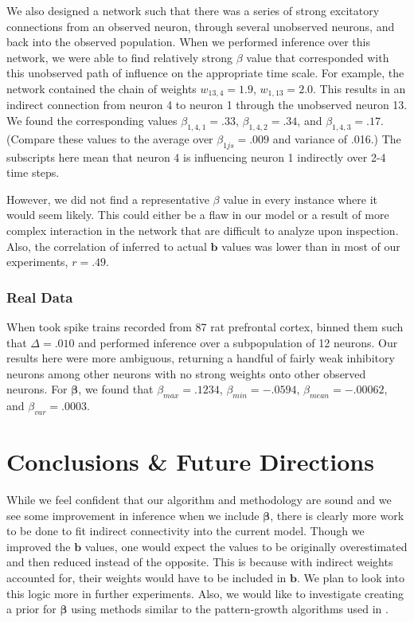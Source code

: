 \documentclass{article}
\begin{document}
We also designed a network such that there was a series of strong excitatory connections from an observed neuron, through several unobserved neurons, and back into the observed population.  When we performed inference over this network, we were able to find relatively strong $\beta$ value that corresponded with this unobserved path of influence on the appropriate time scale. For example, the network contained the chain of weights $w_{13,4}=1.9$, $w_{1,13}=2.0$. This results in an indirect connection from neuron 4 to neuron 1 through the unobserved neuron 13. We found the corresponding values $\beta_{1,4,1}=.33$, $\beta_{1,4,2}=.34$, and $\beta_{1,4,3}=.17$. (Compare these values to the average over $\beta_{1js}=.009$ and variance of .016.) The subscripts here mean that neuron 4 is influencing neuron 1 indirectly over 2-4 time steps.

However, we did not find a representative $\beta$ value in every instance where it would seem likely. This could either be a flaw in our model or a result of more complex interaction in the network that are difficult to analyze upon inspection. Also, the correlation of inferred to actual $\mathbf{b}$ values was lower than in most of our experiments, $r=.49$.

\subsubsection{Real Data}

When took spike trains recorded from 87 rat prefrontal cortex, binned them such that $\Delta = .010$ and performed inference over a subpopulation of 12 neurons. Our results here were more ambiguous, returning a handful of fairly weak inhibitory neurons among other neurons with no strong weights onto other observed neurons. For  $\bm{\beta}$, we found that $\beta_{max}=.1234$, $\beta_{min}=-.0594$, $\beta_{mean}=-.00062$, and $\beta_{var}=.0003$.

\section{Conclusions \& Future Directions}

While we feel confident that our algorithm and methodology are sound and we see some improvement in inference when we include $\bm{\beta}$, there is clearly more work to be done to fit indirect connectivity into the current model. Though we improved the $\mathbf{b}$ values, one would expect the values to be originally overestimated and then reduced instead of the opposite. This is because with indirect weights accounted for, their weights would have to be included in $\mathbf{b}$. We plan to look into this logic more in further experiments. Also, we would like to investigate creating a prior for $\bm{\beta}$ using methods similar to the pattern-growth algorithms used in \citep{patnaik2011}.
\end{document}

